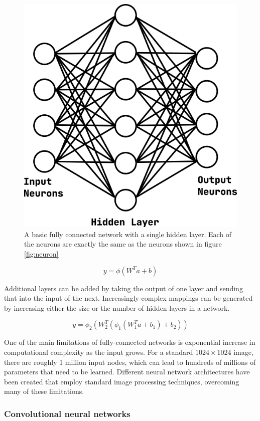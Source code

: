 \begin{figure}[h!]
    \centering
    \includegraphics[width=0.7\linewidth]{figs/background/png/fcn.png}
    \caption[A basic fully connected network with a single hidden layer]{A basic fully connected network with a single hidden layer. Each of the neurons are exactly the same as the neurons shown in figure \ref{fig:neuron}}
    \label{fig:fcn}
\end{figure}

\begin{equation}
    y = \phi(W^{T}a + b)
    \label{eq:fcn}
\end{equation}

Additional layers can be added by taking the output of one layer and sending that into the input of the next. Increasingly complex mappings can be generated by increasing either the size or the number of hidden layers in a network.

\begin{equation}
    y = \phi_2 (W_2^{T}(\phi_1(W_1^{T}a + b_1) + b_2))
    \label{eq:2-layer-fcn}
\end{equation}

One of the main limitations of fully-connected networks is exponential increase in computational complexity as the input grows.
For a standard $1024 \times 1024$ image, there are roughly 1 million input nodes, which can lead to hundreds of millions of parameters that need to be learned.
Different neural network architectures have been created that employ standard image processing techniques, overcoming many of these limitations.

\subsubsection{Convolutional neural networks}

